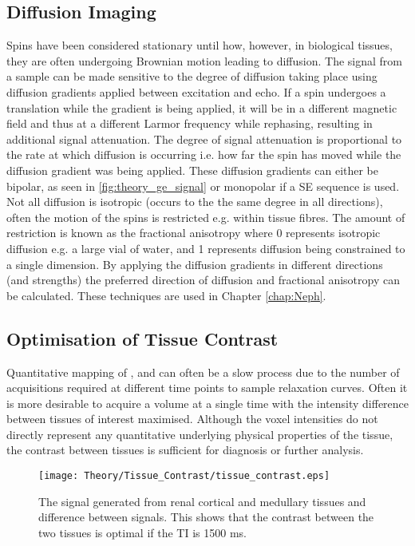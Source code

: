 \subsection{Diffusion Imaging}
Spins have been considered stationary until how, however, in biological tissues, they are often undergoing Brownian motion leading to diffusion. The signal from a sample can be made sensitive to the degree of diffusion taking place using diffusion gradients applied between excitation and echo. If a spin undergoes a translation while the gradient is being applied, it will be in a different magnetic field and thus at a different Larmor frequency while rephasing, resulting in additional signal attenuation. The degree of signal attenuation is proportional to the rate at which diffusion is occurring i.e. how far the spin has moved while the diffusion gradient was being applied. These diffusion gradients can either be bipolar, as seen in \ref{fig:theory_ge_signal} or monopolar if a \ac{SE} sequence is used.\\

Not all diffusion is isotropic (occurs to the the same degree in all directions), often the motion of the spins is restricted e.g. within tissue fibres. The amount of restriction is known as the fractional anisotropy where 0 represents isotropic diffusion e.g. a large vial of water, and 1 represents diffusion being constrained to a single dimension. By applying the diffusion gradients in different directions (and strengths) the preferred direction of diffusion and fractional anisotropy can be calculated. These techniques are used in Chapter \ref{chap:Neph}.

\subsection{Optimisation of Tissue Contrast}
Quantitative mapping of \tone, \ttwo and \ttwostar can often be a slow process due to the number of acquisitions required at different time points to sample relaxation curves. Often it is more desirable to acquire a volume at a single time with the intensity difference between tissues of interest maximised. Although the voxel intensities do not directly represent any quantitative underlying physical properties of the tissue, the contrast between tissues is sufficient for diagnosis or further analysis.
\begin{figure}[H]
	\centering
	\texttt{[image: Theory/Tissue\_Contrast/tissue\_contrast.eps]}
	\caption{The signal generated from renal cortical and medullary tissues \cite{cox_multiparametric_2017} and difference between signals. This shows that the contrast between the two tissues is optimal if the \acf{TI} is 1500 ms.}
	\label{fig:theorgy_tissue_contrast}	
\end{figure}

